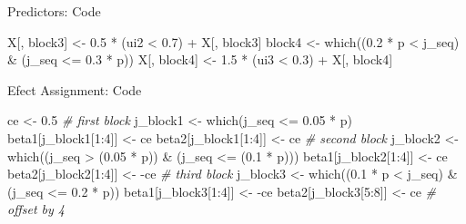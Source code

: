 \documentclass{beamer}
\newenvironment{Shaded}{\begin{snugshade}}{\end{snugshade}}
\newcommand{\DecValTok}[1]{\textcolor[rgb]{0.00,0.00,0.81}{{#1}}}
\newcommand{\FloatTok}[1]{\textcolor[rgb]{0.00,0.00,0.81}{{#1}}}
\newcommand{\SpecialCharTok}[1]{\textcolor[rgb]{0.00,0.00,0.00}{{#1}}}
\newcommand{\CommentTok}[1]{\textcolor[rgb]{0.56,0.35,0.01}{\textit{{#1}}}}
\newcommand{\OtherTok}[1]{\textcolor[rgb]{0.56,0.35,0.01}{{#1}}}
\newcommand{\FunctionTok}[1]{\textcolor[rgb]{0.00,0.00,0.00}{{#1}}}
\newcommand{\NormalTok}[1]{{#1}}
\begin{document}
\begin{frame}[fragile]{Predictors: Code}
\begin{Shaded}
\begin{Highlighting}[]
\NormalTok{  X[, block3] }\OtherTok{\textless{}{-}} \FloatTok{0.5} \SpecialCharTok{*}\NormalTok{ (ui2 }\SpecialCharTok{\textless{}} \FloatTok{0.7}\NormalTok{) }\SpecialCharTok{+}\NormalTok{ X[, block3]}
\NormalTok{  block4 }\OtherTok{\textless{}{-}} \FunctionTok{which}\NormalTok{((}\FloatTok{0.2} \SpecialCharTok{*}\NormalTok{ p }\SpecialCharTok{\textless{}}\NormalTok{ j\_seq) }\SpecialCharTok{\&}\NormalTok{ (j\_seq }\SpecialCharTok{\textless{}=} \FloatTok{0.3} \SpecialCharTok{*}\NormalTok{ p))}
\NormalTok{  X[, block4] }\OtherTok{\textless{}{-}} \FloatTok{1.5} \SpecialCharTok{*}\NormalTok{ (ui3 }\SpecialCharTok{\textless{}} \FloatTok{0.3}\NormalTok{) }\SpecialCharTok{+}\NormalTok{ X[, block4]}
\end{Highlighting}
\end{Shaded}
\end{frame}

\begin{frame}[fragile]{Efect Assignment: Code}
\protect\hypertarget{efect-assignment-code}{}
\begin{Shaded}
\begin{Highlighting}[]
\NormalTok{  ce }\OtherTok{\textless{}{-}} \FloatTok{0.5}
  \CommentTok{\# first block}
\NormalTok{  j\_block1 }\OtherTok{\textless{}{-}} \FunctionTok{which}\NormalTok{(j\_seq }\SpecialCharTok{\textless{}=} \FloatTok{0.05} \SpecialCharTok{*}\NormalTok{ p)}
\NormalTok{  beta1[j\_block1[}\DecValTok{1}\SpecialCharTok{:}\DecValTok{4}\NormalTok{]] }\OtherTok{\textless{}{-}}\NormalTok{ ce}
\NormalTok{  beta2[j\_block1[}\DecValTok{1}\SpecialCharTok{:}\DecValTok{4}\NormalTok{]] }\OtherTok{\textless{}{-}}\NormalTok{ ce}
  \CommentTok{\# second block}
\NormalTok{  j\_block2 }\OtherTok{\textless{}{-}} \FunctionTok{which}\NormalTok{((j\_seq }\SpecialCharTok{\textgreater{}}\NormalTok{ (}\FloatTok{0.05} \SpecialCharTok{*}\NormalTok{ p)) }\SpecialCharTok{\&}\NormalTok{ (j\_seq }\SpecialCharTok{\textless{}=}\NormalTok{ (}\FloatTok{0.1} \SpecialCharTok{*}\NormalTok{ p)))}
\NormalTok{  beta1[j\_block2[}\DecValTok{1}\SpecialCharTok{:}\DecValTok{4}\NormalTok{]] }\OtherTok{\textless{}{-}}\NormalTok{ ce}
\NormalTok{  beta2[j\_block2[}\DecValTok{1}\SpecialCharTok{:}\DecValTok{4}\NormalTok{]] }\OtherTok{\textless{}{-}} \SpecialCharTok{{-}}\NormalTok{ce}
  \CommentTok{\# third block}
\NormalTok{  j\_block3 }\OtherTok{\textless{}{-}} \FunctionTok{which}\NormalTok{((}\FloatTok{0.1} \SpecialCharTok{*}\NormalTok{ p }\SpecialCharTok{\textless{}}\NormalTok{ j\_seq) }\SpecialCharTok{\&}\NormalTok{ (j\_seq }\SpecialCharTok{\textless{}=} \FloatTok{0.2} \SpecialCharTok{*}\NormalTok{ p))}
\NormalTok{  beta1[j\_block3[}\DecValTok{1}\SpecialCharTok{:}\DecValTok{4}\NormalTok{]] }\OtherTok{\textless{}{-}} \SpecialCharTok{{-}}\NormalTok{ce}
\NormalTok{  beta2[j\_block3[}\DecValTok{5}\SpecialCharTok{:}\DecValTok{8}\NormalTok{]] }\OtherTok{\textless{}{-}}\NormalTok{ ce }\CommentTok{\# offset by 4}
\end{Highlighting}
\end{Shaded}
\end{frame}
\end{document}
